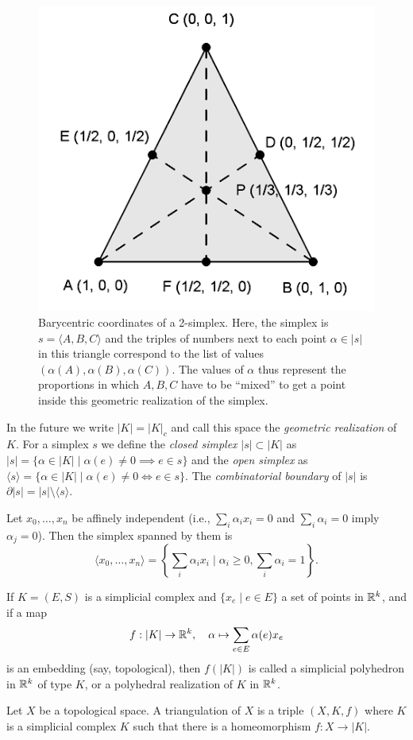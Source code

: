 \begin{figure}[tp]
    \centering
    \includegraphics[scale=0.3]{figures/barycentric.png}
    \caption{Barycentric coordinates of a 2-simplex. Here, the simplex is $s=\langle A,B,C\rangle$ and the triples of numbers next to each point $\alpha\in |s|$ in this triangle correspond to the list of values $(\alpha(A),\alpha(B),\alpha(C))$. The values of $\alpha$ thus represent the proportions in which $A,B,C$ have to be ``mixed'' to get a point inside this geometric realization of the simplex.\label{fig. simplex}}
\end{figure}


In the future we write $|K|=|K|_c$ and call this space the \emph{geometric realization} of $K$. For a simplex $s$ we define the \emph{closed simplex} $|s|\subset |K|$ as $|s|=\{\alpha\in|K|\mid \alpha(e)\neq 0\implies e\in s\}$ and the \emph{open simplex} as $\langle s\rangle=\{\alpha\in |K|\mid \alpha(e)\neq 0\Leftrightarrow e\in s\}$. The \emph{combinatorial boundary} of $|s|$ is $\partial|s|=|s|\setminus\langle s\rangle$.

\begin{defn}
    Let $x_0,\ldots,x_n$ be affinely independent (i.e., $\sum_i\alpha_i x_i=0$ and $\sum_i\alpha_i=0$ imply $\alpha_j=0$). Then the simplex spanned by them is \[\langle x_0,\ldots,x_n\rangle=\left\{\sum_i \alpha_i x_i\mid \alpha_i\geq 0,\sum_i \alpha_i=1\right\}.\]
\end{defn}
\begin{defn}
    If $K=(E,S)$ is a simplicial complex and $\{x_e\mid e\in E\}$ a set of points in $\mathbb{R}^k$, and if a map
    \[f:|K|\to \mathbb{R}^k,\quad \alpha\mapsto \sum_{e\in E}\alpha(e)x_e\]
    is an embedding (say, topological), then $f(|K|)$ is called a simplicial polyhedron in $\mathbb{R}^k$ of type $K$, or a polyhedral realization of $K$ in $\mathbb{R}^k$.
\end{defn}
\begin{defn}[Triangulation]
    Let $X$ be a topological space. A triangulation of $X$ is a triple $(X,K,f)$ where $K$ is a simplicial complex $K$ such that there is a homeomorphism $f:X\to |K|$.
\end{defn}


